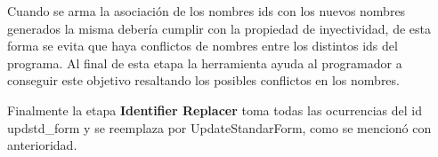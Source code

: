 \documentclass[12pt]{report}
\begin{document}
Cuando se arma la asociación de los nombres ids con los nuevos nombres generados la misma debería cumplir con la propiedad de inyectividad, de esta forma se evita que haya conflictos de nombres entre los distintos ids del programa. Al final de esta etapa la herramienta ayuda al programador a conseguir este objetivo resaltando los posibles conflictos en los nombres.

Finalmente la etapa \textbf{Identifier Replacer} toma todas las ocurrencias del id \textsf{updstd\_form} y se reemplaza por \textsf{UpdateStandarForm}, como se mencionó con anterioridad.







\end{document}
